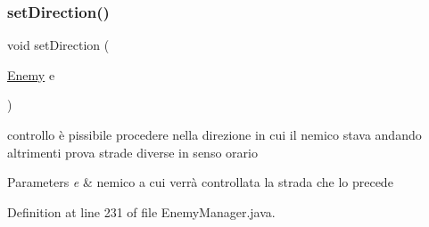 \subsubsection{\texorpdfstring{set\+Direction()}{setDirection()}}
{\footnotesize\ttfamily void set\+Direction (\begin{DoxyParamCaption}\item[{\hyperlink{classenemies_1_1_enemy}{Enemy}}]{e }\end{DoxyParamCaption})\hspace{0.3cm}{\ttfamily [private]}}



controllo è pissibile procedere nella direzione in cui il nemico stava andando altrimenti prova strade diverse in senso orario 


\begin{DoxyParams}{Parameters}
{\em e} & nemico a cui verrà controllata la strada che lo precede \\
\hline
\end{DoxyParams}


Definition at line 231 of file Enemy\+Manager.\+java.

